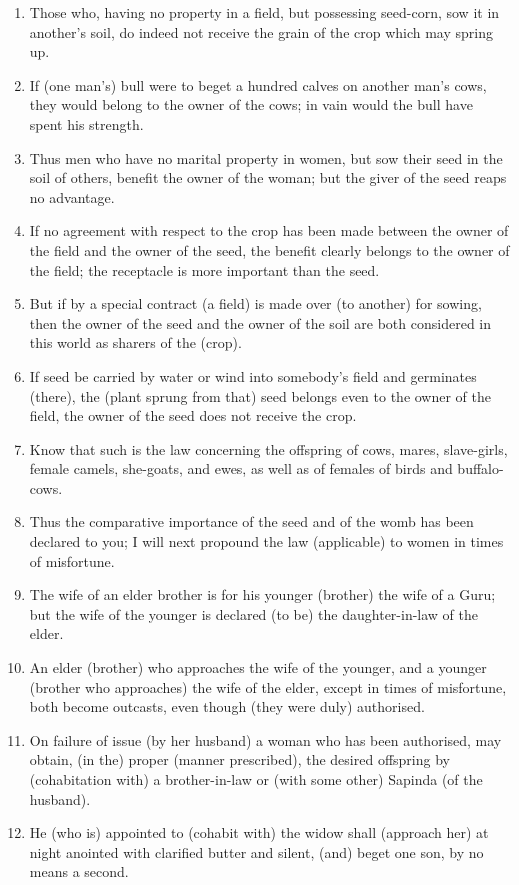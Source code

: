 \begin{enumerate}
\item Those who, having no property in a field, but possessing seed-corn, sow it in another's soil, do indeed not receive the grain of the crop which may spring up.
\item If (one man's) bull were to beget a hundred calves on another man's cows, they would belong to the owner of the cows; in vain would the bull have spent his strength.
\item Thus men who have no marital property in women, but sow their seed in the soil of others, benefit the owner of the woman; but the giver of the seed reaps no advantage.
\item If no agreement with respect to the crop has been made between the owner of the field and the owner of the seed, the benefit clearly belongs to the owner of the field; the receptacle is more important than the seed.
\item But if by a special contract (a field) is made over (to another) for sowing, then the owner of the seed and the owner of the soil are both considered in this world as sharers of the (crop).
\item If seed be carried by water or wind into somebody's field and germinates (there), the (plant sprung from that) seed belongs even to the owner of the field, the owner of the seed does not receive the crop.
\item Know that such is the law concerning the offspring of cows, mares, slave-girls, female camels, she-goats, and ewes, as well as of females of birds and buffalo-cows.
\item Thus the comparative importance of the seed and of the womb has been declared to you; I will next propound the law (applicable) to women in times of misfortune.
\item The wife of an elder brother is for his younger (brother) the wife of a Guru; but the wife of the younger is declared (to be) the daughter-in-law of the elder.
\item An elder (brother) who approaches the wife of the younger, and a younger (brother who approaches) the wife of the elder, except in times of misfortune, both become outcasts, even though (they were duly) authorised.
\item On failure of issue (by her husband) a woman who has been authorised, may obtain, (in the) proper (manner prescribed), the desired offspring by (cohabitation with) a brother-in-law or (with some other) Sapinda (of the husband).
\item He (who is) appointed to (cohabit with) the widow shall (approach her) at night anointed with clarified butter and silent, (and) beget one son, by no means a second.

\end{enumerate}
